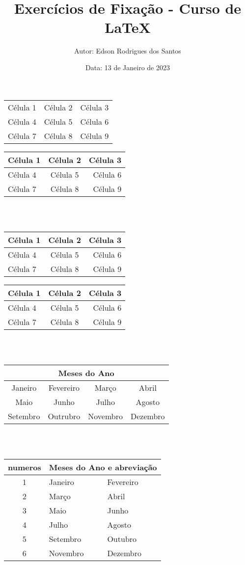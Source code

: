 \documentclass[a4paper,12pt]{article}
\title{\textbf{Exercícios de Fixação - Curso de LaTeX}}
\author{Autor: Edson Rodrigues dos Santos}
\date{Data: 13 de Janeiro de 2023}
\begin{document}
\begin{tabular}{|l|c|r|}
Célula 1 & Célula 2 & Célula 3\\
Célula 4 & Célula 5 & Célula 6\\
Célula 7 & Célula 8 & Célula 9	
\end{tabular}
\hspace*{2cm}
\begin{tabular}{|l|c|r|} \hline
Célula 1 & Célula 2 & Célula 3\\ \hline
Célula 4 & Célula 5 & Célula 6\\
Célula 7 & Célula 8 & Célula 9	
\end{tabular}\\\\

\begin{tabular}{|l|c|r|} \hline
Célula 1 & Célula 2 & Célula 3\\ \hline
Célula 4 & Célula 5 & Célula 6\\ \hline
Célula 7 & Célula 8 & Célula 9\\ 	
\end{tabular}\hspace*{2cm}
\begin{tabular}{|l|c|r|} \hline
Célula 1 & Célula 2 & Célula 3\\ \hline
Célula 4 & Célula 5 & Célula 6\\ \hline
Célula 7 & Célula 8 & Célula 9\\ \hline	
\end{tabular}\\\\


\begin{tabular}{|c|c|c|c|} \hline
\multicolumn{4}{|c|}{Meses do Ano}\\ \hline
Janeiro & Fevereiro & Março & Abril\\ \hline
Maio & Junho & Julho & Agosto\\ \hline
Setembro & Outrubro & Novembro & Dezembro\\\hline	

\end{tabular}\\\\


\begin{tabular}{|c|ll|} \hline
numeros & \multicolumn{2}{|c|}{Meses do Ano e abreviação}\\\hline
1 & Janeiro & Fevereiro\\ \cline{2-3}
2 & Março & Abril\\ \cline{2-3}
3 & Maio & Junho\\ \cline{2-3} 
4 & Julho & Agosto\\ \cline{2-3}
5 & Setembro & Outubro \\ \cline{2-3} 
6 & Novembro & Dezembro\\\hline	
\end{tabular}
\end{document}
